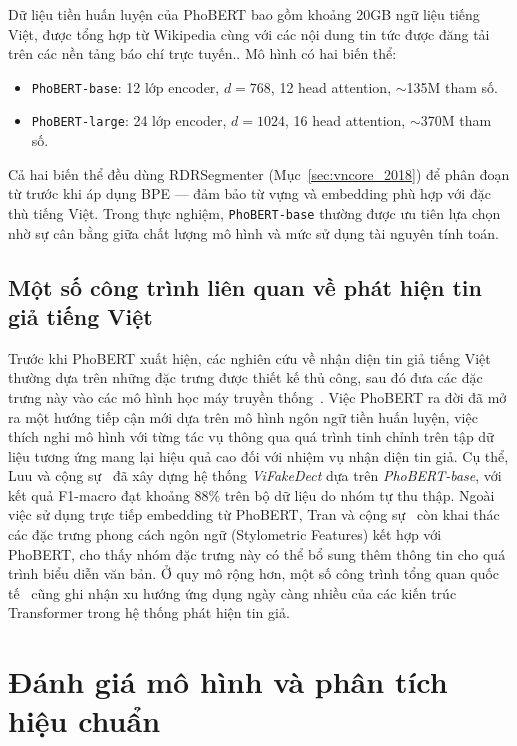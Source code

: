 Dữ liệu tiền huấn luyện của PhoBERT bao gồm khoảng 20GB ngữ liệu tiếng Việt, được tổng hợp từ Wikipedia cùng với các nội dung tin tức được đăng tải trên các nền tảng báo chí trực tuyến.. Mô hình có hai biến thể:
\begin{itemize}[leftmargin=2em]
  \item \texttt{PhoBERT-base}: 12 lớp encoder, $d = 768$, 12 head attention, $\sim$135M tham số.
  \item \texttt{PhoBERT-large}: 24 lớp encoder, $d = 1024$, 16 head attention, $\sim$370M tham số.
\end{itemize}

Cả hai biến thể đều dùng RDRSegmenter (Mục~\ref{sec:vncore_2018}) để phân đoạn từ trước khi áp dụng BPE --- đảm bảo từ vựng và embedding phù hợp với đặc thù tiếng Việt. Trong thực nghiệm, \texttt{PhoBERT-base} thường được ưu tiên lựa chọn nhờ sự cân bằng giữa chất lượng mô hình và mức sử dụng tài nguyên tính toán.
\subsection{Một số công trình liên quan về phát hiện tin giả tiếng Việt}

Trước khi PhoBERT xuất hiện, các nghiên cứu về nhận diện tin giả tiếng Việt thường dựa trên những đặc trưng được thiết kế thủ công, sau đó đưa các đặc trưng này vào các mô hình học máy truyền thống~\cite{vlsp2016}. Việc PhoBERT ra đời đã mở ra một hướng tiếp cận mới dựa trên mô hình ngôn ngữ tiền huấn luyện, việc thích nghi mô hình với từng tác vụ thông qua quá trình tinh chỉnh trên tập dữ liệu tương ứng mang lại hiệu quả cao đối với nhiệm vụ nhận diện tin giả. Cụ thể, Luu và cộng sự~\cite{luu2021vifakedect} đã xây dựng hệ thống \textit{ViFakeDect} dựa trên \textit{PhoBERT-base}, với kết quả F1-macro đạt khoảng 88\% trên bộ dữ liệu do nhóm tự thu thập. Ngoài việc sử dụng trực tiếp embedding từ PhoBERT, Tran và cộng sự~\cite{tran2020vietnamesefake} còn khai thác các đặc trưng phong cách ngôn ngữ (Stylometric Features) kết hợp với PhoBERT, cho thấy nhóm đặc trưng này có thể bổ sung thêm thông tin cho quá trình biểu diễn văn bản. Ở quy mô rộng hơn, một số công trình tổng quan quốc tế~\cite{shu2017fake, zhou2020survey, nakov2022overview} cũng ghi nhận xu hướng ứng dụng ngày càng nhiều của các kiến trúc Transformer trong hệ thống phát hiện tin giả.

\section{Đánh giá mô hình và phân tích hiệu chuẩn}\label{sec:evaluation}

